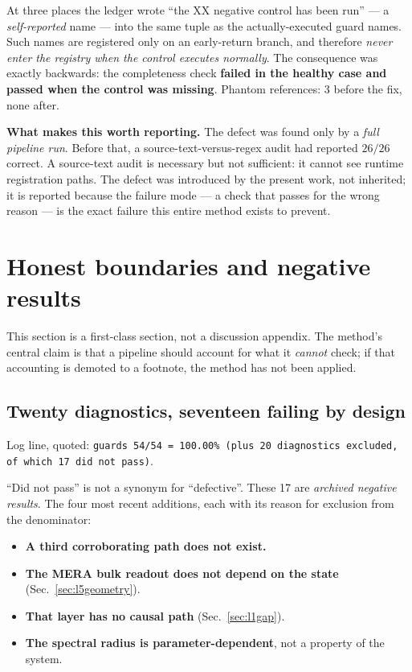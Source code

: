 \documentclass[11pt,a4paper]{article}
\newcommand{\code}[1]{\texttt{\small #1}}
\begin{document}
At three places the ledger wrote ``the XX negative control has been run'' --- a
\emph{self-reported} name --- into the same tuple as the actually-executed guard
names. Such names are registered only on an early-return branch, and therefore
\emph{never enter the registry when the control executes normally}. The consequence
was exactly backwards: the completeness check \textbf{failed in the healthy case and
passed when the control was missing}. Phantom references: 3 before the fix, none
after.

\medskip
\noindent\textbf{What makes this worth reporting.} The defect was found only by a
\emph{full pipeline run}. Before that, a source-text-versus-regex audit had reported
$26/26$ correct. A source-text audit is necessary but not sufficient: it cannot see
runtime registration paths. The defect was introduced by the present work, not
inherited; it is reported because the failure mode --- a check that passes for the
wrong reason --- is the exact failure this entire method exists to prevent.

\section{Honest boundaries and negative results}
\label{sec:boundaries}

This section is a first-class section, not a discussion appendix. The method's
central claim is that a pipeline should account for what it \emph{cannot} check; if
that accounting is demoted to a footnote, the method has not been applied.

\subsection{Twenty diagnostics, seventeen failing by design}
\label{sec:diagnostics}

\noindent Log line, quoted: \code{guards 54/54 = 100.00\% (plus 20 diagnostics
excluded, of which 17 did not pass)}.

``Did not pass'' is not a synonym for ``defective''. These 17 are \emph{archived
negative results}. The four most recent additions, each with its reason for
exclusion from the denominator:

\begin{itemize}[leftmargin=1.4em,itemsep=3pt]
  \item \textbf{A third corroborating path does not exist.}
  \item \textbf{The MERA bulk readout does not depend on the state}
        (Sec.~\ref{sec:l5geometry}).
  \item \textbf{That layer has no causal path} (Sec.~\ref{sec:l1gap}).
  \item \textbf{The spectral radius is parameter-dependent}, not a property of the
        system.
\end{itemize}
\end{document}
